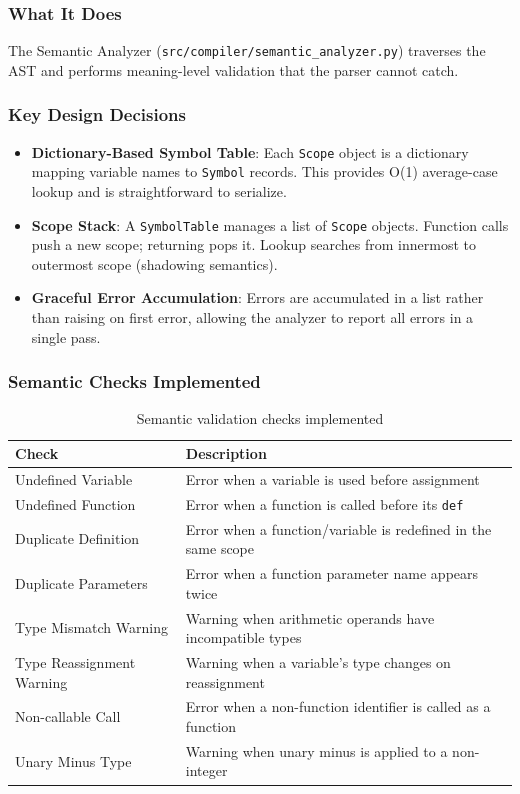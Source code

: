 \documentclass[a4paper,11pt]{article}
\begin{document}
\subsubsection{What It Does}

The Semantic Analyzer (\texttt{src/compiler/semantic\_analyzer.py}) traverses the AST and performs meaning-level validation that the parser cannot catch.

\subsubsection{Key Design Decisions}

\begin{itemize}
    \item \textbf{Dictionary-Based Symbol Table}: Each \texttt{Scope} object is a dictionary mapping variable names to \texttt{Symbol} records. This provides O(1) average-case lookup and is straightforward to serialize.
    \item \textbf{Scope Stack}: A \texttt{SymbolTable} manages a list of \texttt{Scope} objects. Function calls push a new scope; returning pops it. Lookup searches from innermost to outermost scope (shadowing semantics).
    \item \textbf{Graceful Error Accumulation}: Errors are accumulated in a list rather than raising on first error, allowing the analyzer to report all errors in a single pass.
\end{itemize}

\subsubsection{Semantic Checks Implemented}

\begin{table}[h!]
\centering
\begin{tabularx}{\textwidth}{|l|X|}
\hline
\rowcolor{blue!10}
\textbf{Check} & \textbf{Description} \\
\hline
Undefined Variable & Error when a variable is used before assignment \\
\hline
Undefined Function & Error when a function is called before its \texttt{def} \\
\hline
Duplicate Definition & Error when a function/variable is redefined in the same scope \\
\hline
Duplicate Parameters & Error when a function parameter name appears twice \\
\hline
Type Mismatch Warning & Warning when arithmetic operands have incompatible types \\
\hline
Type Reassignment Warning & Warning when a variable's type changes on reassignment \\
\hline
Non-callable Call & Error when a non-function identifier is called as a function \\
\hline
Unary Minus Type & Warning when unary minus is applied to a non-integer \\
\hline
\end{tabularx}
\caption{Semantic validation checks implemented}
\end{table}
\end{document}
